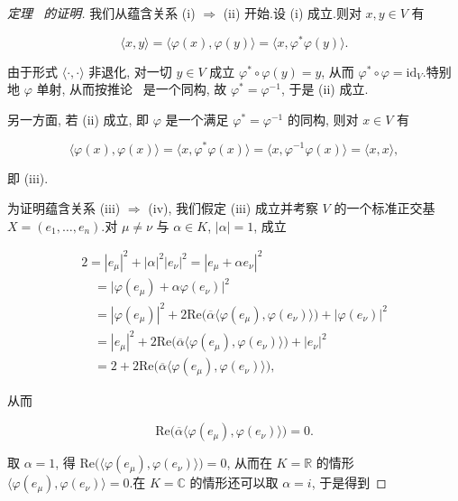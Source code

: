 \begin{proof}[定理~ 的证明]
我们从蕴含关系 (i) $\Longrightarrow$ (ii) 开始.设 (i) 成立.则对 $x, y \in V$ 有

\[
\langle x, y \rangle = \bigl\langle \varphi(x), \varphi(y) \bigr\rangle = \bigl\langle x, \varphi^* \varphi(y) \bigr\rangle\text{.}
\]

由于形式 $\langle \cdot, \cdot \rangle$ 非退化, 对一切 $y \in V$ 成立 $\varphi^* \circ \varphi(y) = y$, 从而 $\varphi^* \circ \varphi = \mathrm{id}_V$.特别地 $\varphi$ 单射, 从而按推论~ 是一个同构, 故 $\varphi^* = \varphi^{-1}$, 于是 (ii) 成立.

另一方面, 若 (ii) 成立, 即 $\varphi$ 是一个满足 $\varphi^* = \varphi^{-1}$ 的同构, 则对 $x \in V$ 有

\[
\bigl\langle \varphi(x), \varphi(x) \bigr\rangle = \bigl\langle x, \varphi^* \varphi(x) \bigr\rangle = \bigl\langle x, \varphi^{-1} \varphi(x) \bigr\rangle = \langle x, x \rangle,
\]

即 (iii).

为证明蕴含关系 (iii) $\Longrightarrow$ (iv), 我们假定 (iii) 成立并考察 $V$ 的一个标准正交基 $X = (e_1, \ldots, e_n)$.对 $\mu \neq \nu$ 与 $\alpha \in K$, $|\alpha| = 1$, 成立

\[
\begin{array}{l}
2 = |e_\mu|^2 + |\alpha|^2 |e_\nu|^2 = |e_\mu + \alpha e_\nu|^2 \\
\quad = \bigl|\varphi(e_\mu) + \alpha \varphi(e_\nu)\bigr|^2 \\
\quad = |\varphi(e_\mu)|^2 + 2 \mathrm{Re}\bigl(\overline{\alpha} \langle \varphi(e_\mu), \varphi(e_\nu) \rangle\bigr) + |\varphi(e_\nu)|^2 \\
\quad = |e_\mu|^2 + 2 \mathrm{Re}\bigl(\overline{\alpha} \langle \varphi(e_\mu), \varphi(e_\nu) \rangle\bigr) + |e_\nu|^2 \\
\quad = 2 + 2 \mathrm{Re}\bigl(\overline{\alpha} \langle \varphi(e_\mu), \varphi(e_\nu) \rangle\bigr),
\end{array}
\]

从而

\[
\mathrm{Re}\bigl(\overline{\alpha} \bigl\langle \varphi(e_\mu), \varphi(e_\nu) \bigr\rangle\bigr) = 0\text{.}
\]

取 $\alpha = 1$, 得 $\mathrm{Re}\bigl(\bigl\langle \varphi(e_\mu), \varphi(e_\nu) \bigr\rangle\bigr) = 0$, 从而在 $K = \mathbb{R}$ 的情形 $\bigl\langle \varphi(e_\mu), \varphi(e_\nu) \bigr\rangle = 0$.在 $K = \mathbb{C}$ 的情形还可以取 $\alpha = i$, 于是得到


\end{proof}
